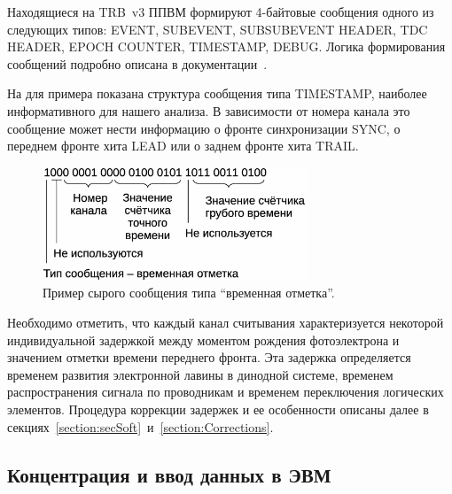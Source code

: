 Находящиеся на TRB~v3 ППВМ формируют 4-байтовые сообщения одного из следующих типов: EVENT, SUBEVENT, SUBSUBEVENT HEADER, TDC HEADER, EPOCH COUNTER, TIMESTAMP, DEBUG. Логика формирования сообщений подробно описана в документации~\cite{TRBDOCU}.

На  для примера показана структура сообщения типа TIMESTAMP, наиболее информативного для нашего анализа. В зависимости от номера канала это сообщение может нести информацию о фронте синхронизации SYNC, о переднем фронте хита LEAD или о заднем фронте хита TRAIL.

\begin{figure}[H]
\centering
\includegraphics[width=0.7\textwidth]{pictures/8_Unpacking.eps}
\caption{Пример сырого сообщения типа ``временная отметка''.}
\label{fig:Unpacking}
\end{figure}


Необходимо отметить, что каждый канал считывания характеризуется некоторой индивидуальной задержкой между моментом рождения фотоэлектрона и значением отметки времени переднего фронта. Эта задержка определяется временем развития электронной лавины в динодной системе, временем распространения сигнала по проводникам и временем переключения логических элементов. Процедура коррекции задержек и ее особенности описаны далее в секциях~\ref{section:secSoft}~и~\ref{section:Corrections}.

\subsection{Концентрация и ввод данных в ЭВМ}\label{section:secFinalReadout}


